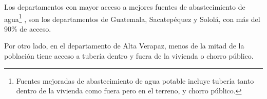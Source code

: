  Los departamentos con mayor acceso a mejores fuentes de abastecimiento de agua\footnote{Fuentes mejoradas de abastecimiento de agua potable incluye tubería tanto  dentro de la vivienda como  fuera pero en el terreno, y chorro público.} , son los departamentos de Guatemala, Sacatepéquez y Sololá, con más del 90\% de acceso. 
 
  Por otro lado, en el departamento de Alta Verapaz, menos de la mitad de la población tiene acceso a tubería dentro y fuera de la vivienda o  chorro público.